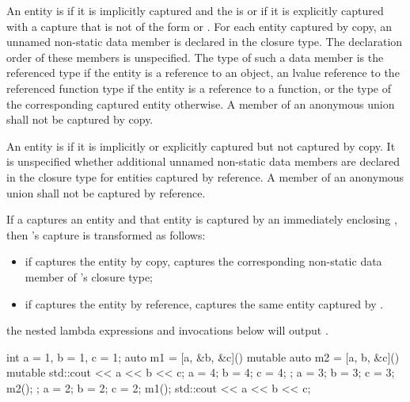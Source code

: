 \pnum
An entity is  if it is implicitly captured and the
 is \tcode{=} or if it is explicitly captured with a
capture that is not of the form \tcode{\&}  or
\tcode{\&}  .
For each entity captured by copy, an
unnamed non-static data member is declared in the closure type. The declaration order of
these members is unspecified. The type of such a data member is
the referenced type if the entity is a reference to an object,
an lvalue reference to the referenced function type if the entity is a reference to a function, or
the type of the corresponding captured entity otherwise.
A member of an anonymous union shall not be captured by copy.

\pnum
An entity is  if it is implicitly or explicitly
captured but not captured by copy. It is unspecified whether additional unnamed
non-static data members are declared in the closure type for entities captured by
reference. A member of an anonymous union shall not be captured by reference.

\pnum
If a   captures an entity and that entity is
captured by an immediately enclosing 
, then
's capture is transformed as follows:

\begin{itemize}
\item if  captures the entity by copy,
 captures the corresponding
non-static data member of 's closure type;

\item if  captures the entity by reference,
 captures the same
entity captured by .
\end{itemize}
\enterexample the nested lambda expressions and invocations below will output
.
\begin{codeblock}
int a = 1, b = 1, c = 1;
auto m1 = [a, &b, &c]() mutable {
  auto m2 = [a, b, &c]() mutable {
    std::cout << a << b << c;
    a = 4; b = 4; c = 4;
  };
  a = 3; b = 3; c = 3;
  m2();
};
a = 2; b = 2; c = 2;
m1();
std::cout << a << b << c;
\end{codeblock}
\exitexample


